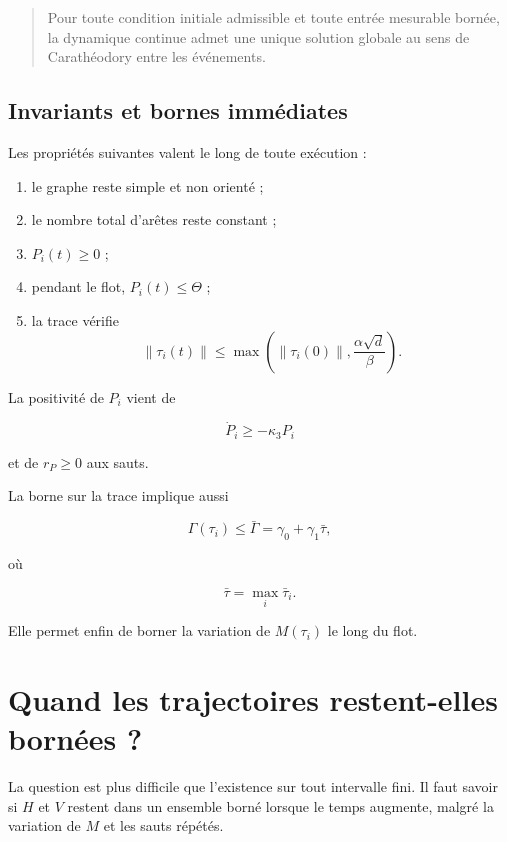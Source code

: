 \begin{quote}
 Pour toute condition initiale admissible et toute entrée mesurable bornée, la dynamique continue admet une unique solution globale au sens de Carathéodory entre les événements.
\end{quote}

\section{Invariants et bornes immédiates}\label{t1-invariants-et-bornes-immediates}

Les propriétés suivantes valent le long de toute exécution :

\begin{enumerate}
\def\labelenumi{\arabic{enumi}.}
\tightlist
\item
  le graphe reste simple et non orienté ;
\item
  le nombre total d'arêtes reste constant ;
\item
  \(P_i(t)\geq 0\) ;
\item
  pendant le flot, \(P_i(t)\leq\Theta\) ;
\item
  la trace vérifie \[
  \|\tau_i(t)\|
  \leq
  \max\left(
  \|\tau_i(0)\|,
  \frac{\alpha\sqrt d}{\beta}
  \right).
  \]
\end{enumerate}

La positivité de \(P_i\) vient de

\[
\dot P_i\geq-\kappa_3P_i
\]

et de \(r_P\geq0\) aux sauts.

La borne sur la trace implique aussi

\[
\Gamma(\tau_i)
\leq
\bar\Gamma
=
\gamma_0+\gamma_1\bar\tau,
\]

où

\[
\bar\tau
=
\max_i\bar\tau_i.
\]

Elle permet enfin de borner la variation de \(M(\tau_i)\) le long du
flot.

\chapter{Quand les trajectoires restent-elles bornées ?}\label{t1-quand-les-trajectoires-restent-elles-bornees}

La question est plus difficile que l'existence sur tout intervalle fini. Il faut savoir si \(H\) et \(V\) restent dans un ensemble borné lorsque le temps augmente, malgré la variation de \(M\) et les sauts répétés.

